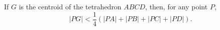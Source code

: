 If $G$ is the centroid of the tetrahedron $ABCD$, then, for any point $P$,
\[ |PG| < \frac{1}{4}\left(|PA| + |PB| + |PC| + |PD|\right). \]
